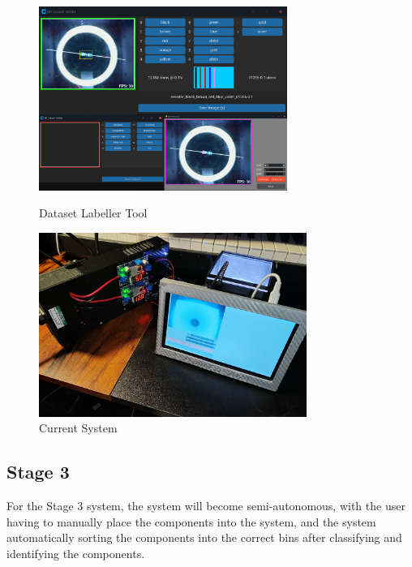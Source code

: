 \begin{figure}[t]
  \begin{minipage}[t]{0.49\textwidth}
      \centering
      \includegraphics[width=\textwidth,height=6cm,keepaspectratio]{imgs/software/tools.png}
      \caption{Dataset Labeller Tool}
      \label{fig:customtool}
  \end{minipage}
  \hfill
  \begin{minipage}[t]{0.49\textwidth}
    \centering
    \includegraphics[width=\textwidth,height=6cm,keepaspectratio]{imgs/design/allparts.jpeg}
    \caption{Current System}
    \label{fig:allparts}
  \end{minipage}
  \hfill
\end{figure}

\subsection{Stage 3}
For the Stage 3 system, the system will become semi-autonomous, with the user having to manually place the components into the system, and the system
automatically sorting the components into the correct bins after classifying and identifying the components. 

